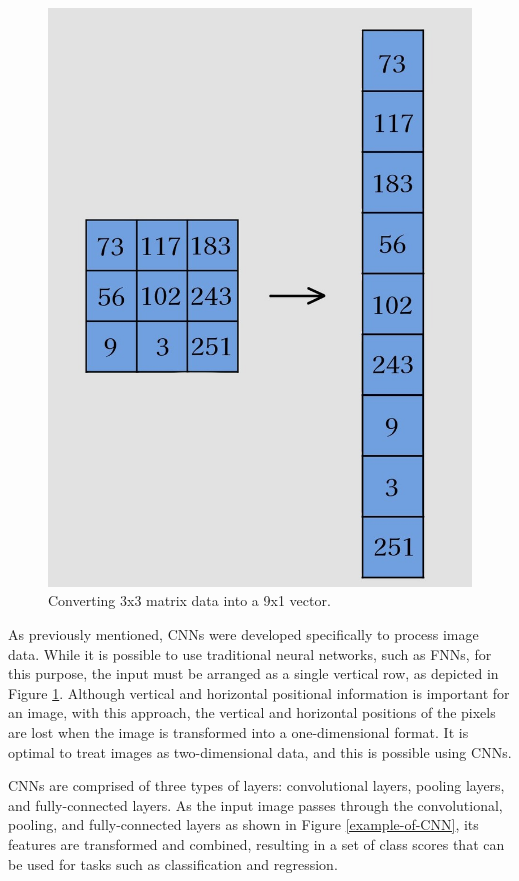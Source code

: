 \begin{figure}[b]
  \centering
  \includegraphics[width=70truemm]{resources/2_background/dimension.png}
  \caption{
    Converting 3x3 matrix data into a 9x1 vector.
  }
  \label{converting-imageddata}
\end{figure}
\clearpage
As previously mentioned, CNNs were developed specifically to process image data.
While it is possible to use traditional neural networks, such as FNNs,
for this purpose, the input must be arranged as a single vertical row, as depicted
in Figure \ref{converting-imageddata}. 
Although vertical and horizontal positional information is important for an image,
with this approach, the vertical and horizontal positions of the pixels are lost 
when the image is transformed into a one-dimensional format. It is optimal to 
treat images as two-dimensional data, and this is possible using CNNs.

CNNs are comprised of three types of layers:
convolutional layers, pooling layers, and fully-connected layers.
As the input image passes through the convolutional, pooling, and fully-connected
layers as shown in Figure \ref{example-of-CNN}, its features are transformed and combined, resulting 
in a set of class scores that can be used for tasks such as classification and 
regression. 

